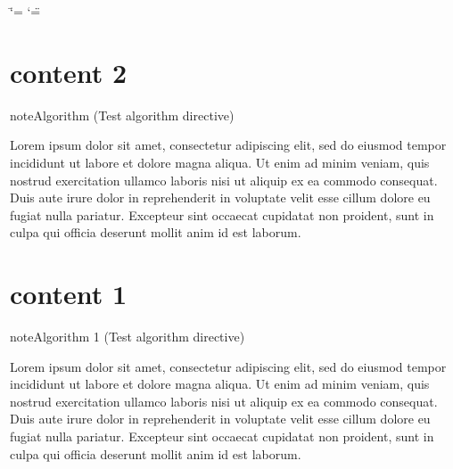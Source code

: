 

\ifdefined\shorthandoff
  \ifnum\catcode`\=\string=\active\shorthandoff{=}\fi
  \ifnum\catcode`\"=\active{}\fi
\fi

\pagestyle{empty}
\sphinxmaketitle
\pagestyle{plain}
\sphinxtableofcontents
\pagestyle{normal}
\label{\detokenize{index::doc}}


\sphinxstepscope


\chapter{content 2}
\label{\detokenize{algorithm/_algo_nonumber:content-2}}\label{\detokenize{algorithm/_algo_nonumber::doc}}\label{algorithm/_algo_nonumber:algorithm-0}
\begin{sphinxadmonition}{note}{Algorithm (Test algorithm directive)}



\sphinxAtStartPar
Lorem ipsum dolor sit amet, consectetur adipiscing elit, sed do eiusmod tempor incididunt ut labore et dolore magna aliqua. Ut enim ad minim veniam, quis nostrud exercitation ullamco laboris nisi ut aliquip ex ea commodo consequat. Duis aute irure dolor in reprehenderit in voluptate velit esse cillum dolore eu fugiat nulla pariatur. Excepteur sint occaecat cupidatat non proident, sunt in culpa qui officia deserunt mollit anim id est laborum.
\end{sphinxadmonition}

\sphinxstepscope


\chapter{content 1}
\label{\detokenize{algorithm/_algo_labeled_titled_with_classname:content-1}}\label{\detokenize{algorithm/_algo_labeled_titled_with_classname::doc}}\label{algorithm/_algo_labeled_titled_with_classname:test-algo-label}
\begin{sphinxadmonition}{note}{Algorithm 1 (Test algorithm directive)}



\sphinxAtStartPar
Lorem ipsum dolor sit amet, consectetur adipiscing elit, sed do eiusmod tempor incididunt ut labore et dolore magna aliqua. Ut enim ad minim veniam, quis nostrud exercitation ullamco laboris nisi ut aliquip ex ea commodo consequat. Duis aute irure dolor in reprehenderit in voluptate velit esse cillum dolore eu fugiat nulla pariatur. Excepteur sint occaecat cupidatat non proident, sunt in culpa qui officia deserunt mollit anim id est laborum.
\end{sphinxadmonition}

